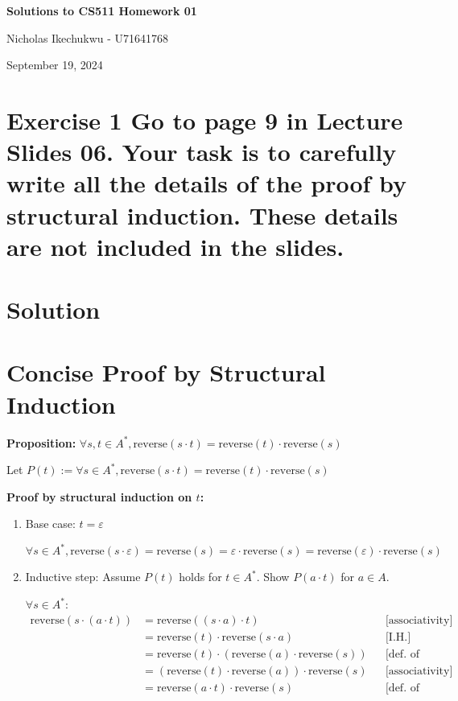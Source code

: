 \documentclass{article}
\begin{document}
\begin{center}
    \Large\textbf{Solutions to CS511 Homework 01}
    
    \vspace{0.5cm}
    
    \large Nicholas Ikechukwu - U71641768
    
    \vspace{0.3cm}
    
    \large September 19, 2024
\end{center}



\section*{Exercise 1 Go to page 9 in Lecture Slides 06. Your task is to carefully write all the details of
the proof by structural induction. These details are not included in the slides.}

\section*{Solution}
\section*{Concise Proof by Structural Induction}

\textbf{Proposition:} $\forall s, t \in A^*, \text{reverse}(s \cdot t) = \text{reverse}(t) \cdot \text{reverse}(s)$

Let $P(t) := \forall s \in A^*, \text{reverse}(s \cdot t) = \text{reverse}(t) \cdot \text{reverse}(s)$

\textbf{Proof by structural induction on $t$:}

\begin{enumerate}
    \item Base case: $t = \varepsilon$
    
    $\forall s \in A^*, \text{reverse}(s \cdot \varepsilon) = \text{reverse}(s) = \varepsilon \cdot \text{reverse}(s) = \text{reverse}(\varepsilon) \cdot \text{reverse}(s)$

    \item Inductive step: Assume $P(t)$ holds for $t \in A^*$. Show $P(a \cdot t)$ for $a \in A$.
    
    $\forall s \in A^*$:
    \begin{align*}
    \text{reverse}(s \cdot (a \cdot t)) 
    &= \text{reverse}((s \cdot a) \cdot t) &&\text{[associativity]} \\
    &= \text{reverse}(t) \cdot \text{reverse}(s \cdot a) &&\text{[I.H.]} \\
    &= \text{reverse}(t) \cdot (\text{reverse}(a) \cdot \text{reverse}(s)) &&\text{[def. of reverse]} \\
    &= (\text{reverse}(t) \cdot \text{reverse}(a)) \cdot \text{reverse}(s) &&\text{[associativity]} \\
    &= \text{reverse}(a \cdot t) \cdot \text{reverse}(s) &&\text{[def. of reverse]}
    \end{align*}
\end{enumerate}
\end{document}
